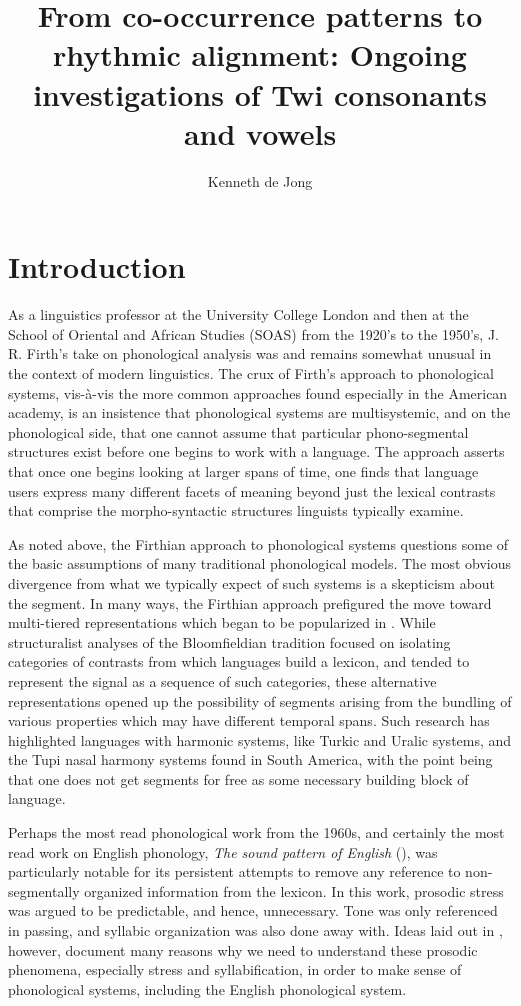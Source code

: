 \documentclass[output=paper,colorlinks,citecolor=brown]{langscibook}
\author{Kenneth de Jong\affiliation{Indiana University}}
\title[From co-occurrence patterns to rhythmic alignment]
      {From co-occurrence patterns to rhythmic alignment: Ongoing investigations of Twi consonants and vowels}
\begin{document}
\maketitle

\section{Introduction}
As a linguistics professor at the University College London and then at the School of Oriental and African Studies (SOAS) from the 1920’s to the 1950’s, J. R. Firth’s take on phonological analysis was and remains somewhat unusual in the context of modern linguistics. The crux of Firth’s approach to phonological systems, vis-à-vis the more common approaches found especially in the American academy, is an insistence that phonological systems are multisystemic, and on the phonological side, that one cannot assume that particular phono-segmental structures exist before one begins to work with a language. The approach asserts that once one begins looking at larger spans of time, one finds that language users express many different facets of meaning beyond just the lexical contrasts that comprise the morpho-syntactic structures linguists typically examine. 

As noted above, the Firthian approach to phonological systems questions some of the basic assumptions of many traditional phonological models. The most obvious divergence from what we typically expect of such systems is a skepticism about the segment. In many ways, the Firthian approach prefigured the move toward multi-tiered representations which began to be popularized in \citet{Goldsmith1976}. While structuralist analyses of the Bloomfieldian tradition focused on isolating categories of contrasts from which languages build a lexicon, and tended to represent the signal as a sequence of such categories, these alternative representations opened up the possibility of segments arising from the bundling of various properties which may have different temporal spans. Such research has highlighted languages with harmonic systems, like Turkic and Uralic  systems, and the Tupi nasal harmony systems found in South America, with the point being that one does not get segments for free as some necessary building block of language.

Perhaps the most read phonological work from the 1960s, and certainly the most read work on English phonology, \textit{The sound pattern of English} (\cite{ChomskyHalle1968}), was particularly notable for its persistent attempts to remove any reference to non-segmentally organized information from the lexicon. In this work, prosodic stress was argued to be predictable, and hence, unnecessary. Tone was only referenced in passing, and syllabic organization was also done away with. Ideas laid out in \citet{Davis1988}, however, document many reasons why we need to understand these prosodic phenomena, especially stress and syllabification, in order to make sense of phonological systems, including the English phonological system. 
\end{document}
